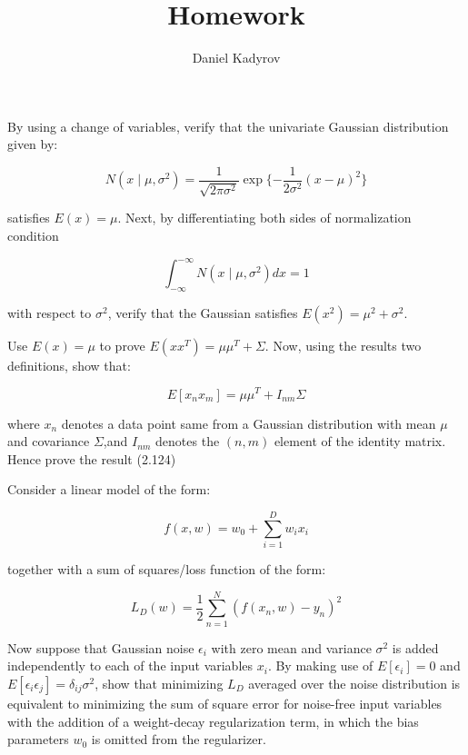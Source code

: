 \documentclass{homework}
\title{Homework}
\author{Daniel Kadyrov}
\begin{document}
\maketitle

\begin{problem}[1]
    By using a change of variables, verify that the univariate Gaussian distribution given by:

    $$
    N(x \mid \mu , \sigma^2) = \frac{1}{\sqrt{2\pi\sigma^2}}\exp\{
        -\frac{1}{2\sigma^2}(x-\mu)^2
        \}
    $$

    satisfies $E(x) = \mu$. Next, by differentiating both sides of normalization condition

    $$
    \int_{-\infty}^{-\infty}N(x \mid \mu, \sigma^2) dx = 1
    $$

    with respect to $\sigma^2$, verify that the Gaussian satisfies $E(x^2)=\mu^2+\sigma^2$.
\end{problem}

\begin{problem}[2]
    Use $E(x) = \mu$ to prove $E(xx^T)=\mu\mu^T+\Sigma$. Now, using the results two definitions, show that:
    
    $$
    E[x_n x_m] = \mu\mu^T + I_{nm}\Sigma
    $$

    where $x_n$ denotes a data point same from a Gaussian distribution with mean $\mu$ and covariance $\Sigma$,and $I_{nm}$ denotes the $(n,m)$ element of the identity matrix. Hence prove the result (2.124)
\end{problem}

\begin{problem}[3]
    Consider a linear model of the form:

    $$
    f(x,w) = w_0 + \sum_{i=1}^D w_i x_i
    $$

    together with a sum of squares/loss function of the form:

    $$
    L_D(w) = \frac{1}{2} \sum_{n=1}^{N} (f(x_n,w)-y_n)^2
    $$

    Now suppose that Gaussian noise $\epsilon_i$ with zero mean and variance $\sigma^2$ is added independently to each of the input variables $x_i$. By making use of $E[\epsilon_i]=0$ and $E[\epsilon_i \epsilon_j]=\delta_{ij}\sigma^2$, show that minimizing $L_D$ averaged over the noise distribution is equivalent to minimizing the sum of square error for noise-free input variables with the addition of a weight-decay regularization term, in which the bias parameters $w_0$ is omitted from the regularizer.
\end{problem}
\end{document}
